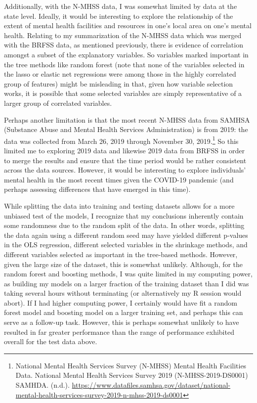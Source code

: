 \documentclass[
]{article}
\begin{document}
Additionally, with the N-MHSS data, I was somewhat limited by data at the state level. Ideally, it would be interesting to explore the relationship of the extent of mental health facilities and resources in one's local area on one's mental health. Relating to my summarization of the N-MHSS data which was merged with the BRFSS data, as mentioned previously, there is evidence of correlation amongst a subset of the explanatory variables. So variables marked important in the tree methods like random forest (note that none of the variables selected in the lasso or elastic net regressions were among those in the highly correlated group of features) might be misleading in that, given how variable selection works, it is possible that some selected variables are simply representative of a larger group of correlated variables.

Perhaps another limitation is that the most recent N-MHSS data from SAMHSA (Substance Abuse and Mental Health Services Administration) is from 2019: the data was collected from March 26, 2019 through November 30, 2019.\footnote{National Mental Health Services Survey (N-MHSS) Mental Health Facilities Data. National Mental Health Services Survey 2019 (N-MHSS-2019-DS0001) \textbar{} SAMHDA. (n.d.). \url{https://www.datafiles.samhsa.gov/dataset/national-mental-health-services-survey-2019-n-mhss-2019-ds0001}} So this limited me to exploring 2019 data and likewise 2019 data from BRFSS in order to merge the results and ensure that the time period would be rather consistent across the data sources. However, it would be interesting to explore individuals' mental health in the most recent times given the COVID-19 pandemic (and perhaps assessing differences that have emerged in this time).

While splitting the data into training and testing datasets allows for a more unbiased test of the models, I recognize that my conclusions inherently contain some randomness due to the random split of the data. In other words, splitting the data again using a different random seed may have yielded different p-values in the OLS regression, different selected variables in the shrinkage methods, and different variables selected as important in the tree-based methods. However, given the large size of the dataset, this is somewhat unlikely. Although, for the random forest and boosting methods, I was quite limited in my computing power, as building my models on a larger fraction of the training dataset than I did was taking several hours without terminating (or alternatively my R session would abort). If I had higher computing power, I certainly would have fit a random forest model and boosting model on a larger training set, and perhaps this can serve as a follow-up task. However, this is perhaps somewhat unlikely to have resulted in far greater performance than the range of performance exhibited overall for the test data above.
\end{document}

